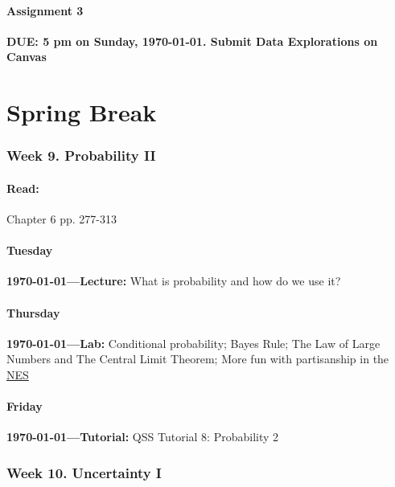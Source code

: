 \vspace{2em}
\subsection{Assignment 3} \textbf{DUE: 5 pm on Sunday, \today. Submit Data Explorations on Canvas}

\AdvanceDate[2]
\AdvanceDate[7]


\vspace{2em}

\part*{Spring Break}

\vspace{2em}


\section{Week 9. Probability II}

\subsection{Read:}

\citet{Imai2022-pm} Chapter 6 pp. 277-313


\subsection{Tuesday} \textbf{\today---Lecture:} What is probability and how do we use it? 
\AdvanceDate[2]

\subsection{Thursday} \textbf{\today---Lab:} Conditional probability; Bayes Rule; The Law of Large Numbers and The Central Limit Theorem; More fun with partisanship in the \href{http://electionstudies.org/}{NES}

\AdvanceDate[1]
\subsection{Friday} \textbf{\today---Tutorial:} QSS Tutorial 8: Probability 2
\AdvanceDate[4]


\section{Week 10. Uncertainty I}


